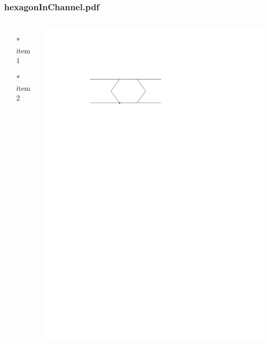 \begin{frame} \frametitle{hexagonInChannel.pdf}
    \begin{columns}[c]
        \begin{itemize}
            \item[*] item 1
            \item[*] item 2
        \end{itemize}
        \begin{minipage}{\linewidth}
            \begin{center}
            \includegraphics[width=.9\textwidth]{graphics/hexagonInChannel.pdf}
            \label{gfx:hexagonInChannel.pdf}
            \end{center}
        \end{minipage}
    \end{columns}
\end{frame}
